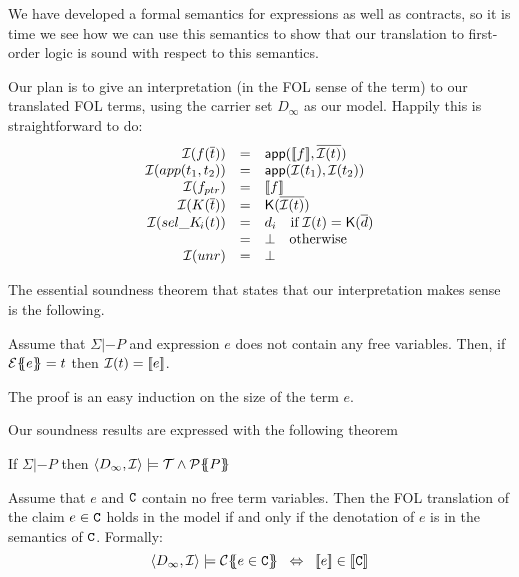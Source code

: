 We have developed a formal semantics for expressions as well as contracts, so it is time we 
see how we can use this semantics to show that our translation to first-order logic is sound 
with respect to this semantics. 

Our plan is to give an interpretation (in the FOL sense of the term) to our 
translated FOL terms, using the carrier set $D_\infty$ as our model. 
Happily this is straightforward to do:
\[\begin{array}{rcl}
   {\cal I}(f(\overline{t})) & = & \mathsf{app}([\![f]\!],\overline{{\cal I}(t)}) \\ 
   {\cal I}(app(t_1,t_2))     & = & \mathsf{app}({\cal I}(t_1), {\cal I}(t_2)) \\
   {\cal I}(f_{ptr})  & = & [\![f]\!] \\
   {\cal I}(K(\overline{t})) & = & \mathsf{K}(\overline{{\cal I}(t)}) \\ 
   {\cal I}(\mathop{sel\_K\!_{i}}(t)) & = &  d_i \quad \mbox{if}\; {\cal I}(t) = \mathsf{K}(\overline{d}) \\ 
                           & = & \bot \quad \mbox{otherwise} \\
  {\cal I}(unr)       & = & \bot 
\end{array}\]

The essential soundness theorem that states that our interpretation makes sense is
the following. 
\begin{theorem} 
Assume that $\Sigma |- P$ and expression $e$ does not contain any free variables. 
Then, if ${\cal E}\{\!\!\{e\}\!\!\} = t$ then ${\cal I}(t) = [\![e]\!]$.
\end{theorem}
The proof is an easy induction on the size of the term $e$.

Our soundness results are expressed with the following theorem 

\begin{theorem}\label{thm:models-inf}
If $\Sigma |- P$ then $\langle D_{\infty},{\cal I}\rangle \models {\cal T} \land {\cal P}\{\!\!\{P\}\!\!\}$ 
\end{theorem} 
\begin{theorem}\label{thm:den-contr-satisfaction} Assume that $e$ and ${\tt C}$ contain no free 
term variables. Then the FOL translation of the claim $e \in {\tt C}$ holds in the model
if and only if the denotation of $e$ is in the semantics of ${\tt C}$.  Formally:
$$\langle D_\infty,{\cal I}\rangle \models \ctrans{}{\cdot}{e \in \Ct}
  \;\; \Leftrightarrow \;\; \dbrace{e} \in \dbrace{\Ct}
$$
\end{theorem} 

